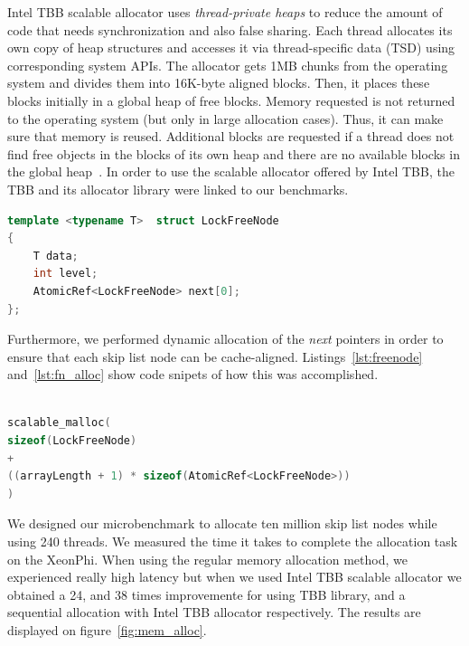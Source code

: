 Intel TBB scalable allocator uses \textit{thread-private heaps} to reduce the amount of code that needs synchronization and also false sharing. Each thread allocates its own copy of heap structures and accesses it via thread-specific data (TSD) using corresponding system APIs.
The allocator gets 1MB chunks from the operating system and divides them into 16K-byte aligned blocks. Then, it places these blocks initially in a global heap of free blocks. Memory requested is not returned to the operating system (but only in large allocation cases). Thus, it can make sure that memory is reused. Additional blocks are requested if a thread does not find free objects in the blocks of its own heap and there are no available blocks in the global heap~\cite{_thefoundations,Hudson:2006:MST:1133956.1133967}. In order to use the scalable allocator offered by Intel TBB, the TBB and its allocator library were linked to our benchmarks.

\begin{lstlisting}[language=C++,basicstyle=\tt\scriptsize,captionpos=b,caption=Lock free node structure,label=lst:freenode,morekeywords={*, size_t}]
template <typename T>  struct LockFreeNode
{	
	T data;
	int	level;
	AtomicRef<LockFreeNode>	next[0];
};
\end{lstlisting}

Furthermore, we performed dynamic allocation of the {\em next} pointers in order to ensure that each skip list node can be cache-aligned. Listings~\ref{lst:freenode} and~\ref{lst:fn_alloc} show code snipets of how this was accomplished.
\begin{lstlisting}[language=C++,basicstyle=\tt\scriptsize,captionpos=b,caption=Memory allocation instruction for array of atomic references,label=lst:fn_alloc, morekeywords={*, size_t}]

scalable_malloc(
sizeof(LockFreeNode) 
+ 
((arrayLength + 1) * sizeof(AtomicRef<LockFreeNode>))
)
\end{lstlisting}

We designed our microbenchmark to allocate ten million skip list nodes while using 240 threads. We measured the time it takes to complete the allocation task on the XeonPhi. When using the regular memory allocation method, we experienced really high latency but when we used Intel TBB scalable allocator we obtained a 24, and 38 times improvemente for using TBB library, and a sequential allocation with Intel TBB allocator respectively. The results are displayed on figure~\ref{fig:mem_alloc}.

